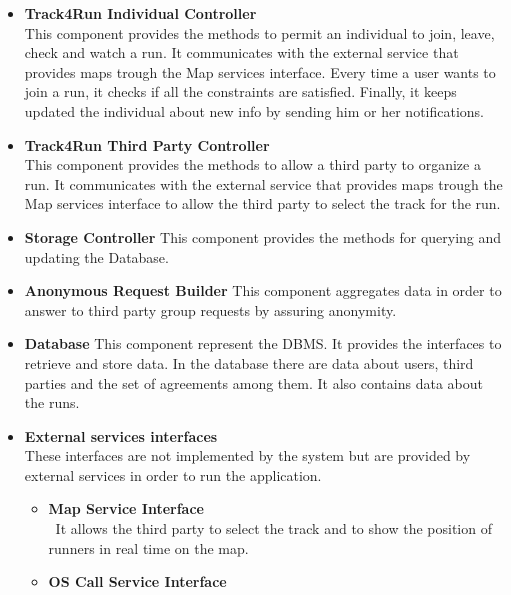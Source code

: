 \begin{legal}
\begin{itemize}
{		This component provides authentication and registration processes for both the individuals and the third parties.
				}\\
		\item{\textbf{Track4Run Individual Controller}\\
		This component provides the methods to permit an individual to join, leave, check and watch a run. It communicates with the external service that provides maps trough the Map services interface. Every time a user wants to join a run, it checks if all the constraints are satisfied. Finally, it keeps updated the individual about new info by sending him or her notifications.
				}\\
		\item{\textbf{Track4Run Third Party Controller}\\
		This component provides the methods to allow a third party to organize a run. It communicates with the external service that provides maps trough the Map services interface to allow the third party to select the track for the run.
				}\\				
		\item{\textbf{Storage Controller}
		This component provides the methods for querying and updating the Database.
				}\\
		\item{\textbf{Anonymous Request Builder}
		This component aggregates data in order to answer to third party group requests by assuring anonymity.
				}\\
		\item{\textbf{Database}
		This component represent the DBMS. It provides the interfaces to retrieve and store data. In the database there are data about users, third parties and the set of agreements among them. It also contains data about the runs.
				}\\
		\item{\textbf{External services interfaces}\\
		These interfaces are not implemented by the system but are provided by external services in order to run the application.
      	\begin{itemize}
		  	\item{\textbf{Map Service Interface}\\\
		  	It allows the third party to select the track and to show the position of runners in real time on the map.
						}\\
			\item{\textbf{OS Call Service Interface}\\
}
\end{itemize}}
\end{itemize}
\end{legal}

